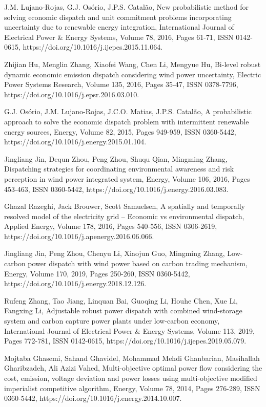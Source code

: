 \begin{thebibliography}{99}
\begin{singlespace}

 J.M. Lujano-Rojas, G.J. Osório, J.P.S. Catalão, New probabilistic method for solving economic dispatch and unit commitment problems incorporating uncertainty due to renewable energy integration, International Journal of Electrical Power \& Energy Systems, Volume 78, 2016, Pages 61-71, ISSN 0142-0615, https://doi.org/10.1016/j.ijepes.2015.11.064.

 Zhijian Hu, Menglin Zhang, Xiaofei Wang, Chen Li, Mengyue Hu, Bi-level robust dynamic economic emission dispatch considering wind power uncertainty, Electric Power Systems Research, Volume 135, 2016, Pages 35-47, ISSN 0378-7796, https://doi.org/10.1016/j.epsr.2016.03.010.

 G.J. Osório, J.M. Lujano-Rojas, J.C.O. Matias, J.P.S. Catalão, A probabilistic approach to solve the economic dispatch problem with intermittent renewable energy sources, Energy, Volume 82, 2015, Pages 949-959, ISSN 0360-5442, https://doi.org/10.1016/j.energy.2015.01.104.

 Jingliang Jin, Dequn Zhou, Peng Zhou, Shuqu Qian, Mingming Zhang, Dispatching strategies for coordinating environmental awareness and risk perception in wind power integrated system, Energy, Volume 106, 2016, Pages 453-463, ISSN 0360-5442, https://doi.org/10.1016/j.energy.2016.03.083.

 Ghazal Razeghi, Jack Brouwer, Scott Samuelsen, A spatially and temporally resolved model of the electricity grid – Economic vs environmental dispatch, Applied Energy, Volume 178, 2016, Pages 540-556, ISSN 0306-2619, https://doi.org/10.1016/j.apenergy.2016.06.066.

  Jingliang Jin, Peng Zhou, Chenyu Li, Xiaojun Guo, Mingming Zhang, Low-carbon power dispatch with wind power based on carbon trading mechanism, Energy, Volume 170, 2019, Pages 250-260, ISSN 0360-5442, https://doi.org/10.1016/j.energy.2018.12.126.

 Rufeng Zhang, Tao Jiang, Linquan Bai, Guoqing Li, Houhe Chen, Xue Li, Fangxing Li, Adjustable robust power dispatch with combined wind-storage system and carbon capture power plants under low-carbon economy, International Journal of Electrical Power \& Energy Systems, Volume 113, 2019, Pages 772-781, ISSN 0142-0615, https://doi.org/10.1016/j.ijepes.2019.05.079.

 Mojtaba Ghasemi, Sahand Ghavidel, Mohammad Mehdi Ghanbarian, Masihallah Gharibzadeh, Ali Azizi Vahed, Multi-objective optimal power flow considering the cost, emission, voltage deviation and power losses using multi-objective modified imperialist competitive algorithm, Energy, Volume 78, 2014, Pages 276-289, ISSN 0360-5442, https://doi.org/10.1016/j.energy.2014.10.007.


\end{singlespace}
\end{thebibliography}

